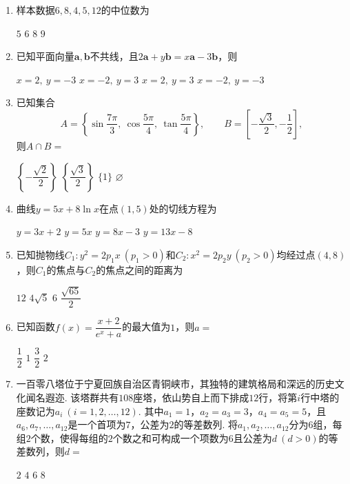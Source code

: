 \documentclass[12pt,a4paper]{article}
\begin{document}
	\begin{enumerate}[leftmargin=*,label=\arabic*.,itemsep=0.8ex]
		
		\item 样本数据$6,8,4,5,12$的中位数为
		\begin{choicesFour}
			\choice $5$ \choice $6$ \choice $8$ \choice $9$
		\end{choicesFour}
		
		\item 已知平面向量$\boldsymbol{a},\boldsymbol{b}$不共线，且$2\boldsymbol{a}+y\boldsymbol{b}=x\boldsymbol{a}-3\boldsymbol{b}$，则
		\begin{choicesFour}
			\choice $x=2,\ y=-3$ \choice $x=-2,\ y=3$ \choice $x=2,\ y=3$ \choice $x=-2,\ y=-3$
		\end{choicesFour}
		
		\item 已知集合
		\[
		A=\left\{\sin\frac{7\pi}{3},\ \cos\frac{5\pi}{4},\ \tan\frac{5\pi}{4}\right\},\qquad
		B=\left[-\frac{\sqrt3}{2},-\frac12\right],
		\]
		则$A\cap B=$
		\begin{choicesFour}
			\choice $\left\{-\dfrac{\sqrt2}{2}\right\}$
			\choice $\left\{\dfrac{\sqrt3}{2}\right\}$
			\choice $\{1\}$
			\choice $\varnothing$
		\end{choicesFour}
		
		\item 曲线$y=5x+8\ln x$在点$(1,5)$处的切线方程为
		\begin{choicesFour}
			\choice $y=3x+2$ \choice $y=5x$ \choice $y=8x-3$ \choice $y=13x-8$
		\end{choicesFour}
		
		\item 已知抛物线$C_1:y^2=2p_1x\ (p_1>0)$和$C_2:x^2=2p_2y\ (p_2>0)$均经过点$(4,8)$，则$C_1$的焦点与$C_2$的焦点之间的距离为
		\begin{choicesFour}
			\choice $12$ \choice $4\sqrt5$ \choice $6$ \choice $\dfrac{\sqrt{65}}{2}$
		\end{choicesFour}
		
		\item 已知函数$f(x)=\dfrac{x+2}{e^x+a}$的最大值为$1$，则$a=$
		\begin{choicesFour}
			\choice $\dfrac12$ \choice $1$ \choice $\dfrac32$ \choice $2$
		\end{choicesFour}
		
		\item 一百零八塔位于宁夏回族自治区青铜峡市，其独特的建筑格局和深远的历史文化闻名遐迩. 该塔群共有$108$座塔，依山势自上而下排成$12$行，将第$i$行中塔的座数记为$a_i\ (i=1,2,\dots,12)$. 其中$a_1=1$，$a_2=a_3=3$，$a_4=a_5=5$，且$a_6,a_7,\dots,a_{12}$是一个首项为$7$，公差为$2$的等差数列. 将$a_1,a_2,\dots,a_{12}$分为$6$组，每组$2$个数，使得每组的$2$个数之和可构成一个项数为$6$且公差为$d\ (d>0)$的等差数列，则$d=$
		\begin{choicesFour}
			\choice $2$ \choice $4$ \choice $6$ \choice $8$
		\end{choicesFour}
		

\end{enumerate}
\end{document}
